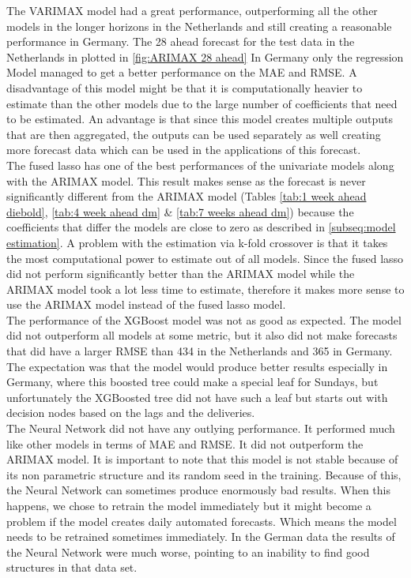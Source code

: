 The VARIMAX model had a great performance, outperforming all the other models in the longer horizons in the Netherlands and still creating a reasonable performance in Germany. The 28 ahead forecast for the test data in the Netherlands in plotted in \autoref{fig:ARIMAX 28 ahead} In Germany only the regression Model managed to get a better performance on the MAE and RMSE. A disadvantage of this model might be that it is computationally heavier to estimate than the other models due to the large number of coefficients that need to be estimated. An advantage is that since this model creates multiple outputs that are then aggregated, the outputs can be used separately as well creating more forecast data which can be used in the applications of this forecast.\\

The fused lasso has one of the best performances of the univariate models along with the ARIMAX model. This result makes sense as the forecast is never significantly different from the ARIMAX model (Tables \ref{tab:1 week ahead diebold}, \ref{tab:4 week ahead dm} \& \ref{tab:7 weeks ahead dm}) because the coefficients that differ the models are close to zero as described in \autoref{subseq:model estimation}. A problem with the estimation via k-fold crossover is that it takes the most computational power to estimate out of all models. Since the fused lasso did not perform significantly better than the ARIMAX model while the ARIMAX model took a lot less time to estimate, therefore it makes more sense to use the ARIMAX model instead of the fused lasso model.\\

The performance of the XGBoost model was not as good as expected. The model did not outperform all models at some metric, but it also did not make forecasts that did have a larger RMSE than 434 in the Netherlands and 365 in Germany. The expectation was that the model would produce better results especially in Germany, where this boosted tree could make a special leaf for Sundays, but unfortunately the XGBoosted tree did not have such a leaf but starts out with decision nodes based on the lags and the deliveries. \\

The Neural Network did not have any outlying performance. It performed much like other models in terms of MAE and RMSE. It did not outperform the ARIMAX  model. It is important to note that this model is not stable because of its non parametric structure and its random seed in the training. Because of this, the Neural Network can sometimes produce enormously bad results. When this happens, we chose to retrain the model immediately but it might become a problem if the model creates daily automated forecasts. Which means the model needs to be retrained sometimes immediately. In the German data the results of the Neural Network were much worse, pointing to an inability to find good structures in that data set.\\

